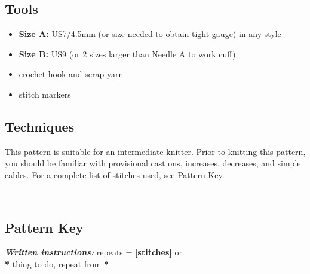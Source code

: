 \documentclass[12pt]{article}
\newcommand{\vocab}[1]{\emph{\textbf{#1}}} %
\newcommand{\rowDir}[1]{\textbf{#1:}} %
\renewcommand{\repeat}[1]{\textbf{[#1]}} %
\newcommand{\repmark}{\textbf{*}}
\newcommand{\longrepeat}[1]{\textbf{\repmark} #1, repeat from \repmark}%
\begin{document}
\begin{multicols}{2}
\subsection*{Tools}

\begin{itemize}
\item \rowDir{Size A} US7/4.5mm (or size needed to obtain tight gauge) in any style %
\item \rowDir{Size B} US9 (or 2 sizes larger than Needle A to work cuff)
\item crochet hook and scrap yarn
\item stitch markers%
\end{itemize}

\subsection*{Techniques}

This pattern is suitable for an intermediate knitter. %
Prior to knitting this pattern, you should be familiar with provisional cast ons, increases, decreases, and simple cables. %
For a complete list of stitches used, see Pattern Key.

~\\

\vfill
\newpage

\subsection*{Pattern Key}


\vocab{Written instructions:} repeats = \repeat{stitches} or \\\longrepeat{thing to do}


\end{multicols}
\end{document}
